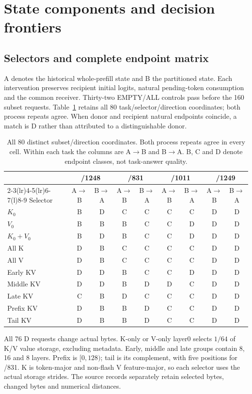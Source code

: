 \section{State components and decision frontiers}
\label{supp:composition}\label{supp:subsets}
\subsection{Selectors and complete endpoint matrix}
A denotes the historical whole-prefill state and B the partitioned state. Each intervention preserves recipient initial logits, natural pending-token consumption and the common receiver. Thirty-two EMPTY/ALL controls pass before the 160 subset requests. Table~\ref{tab:subsetmatrix} retains all 80 task/selector/direction coordinates; both process repeats agree. When donor and recipient natural endpoints coincide, a match is D rather than attributed to a distinguishable donor.
\begin{table}[t]
\centering\small
\caption{All 80 distinct subset/direction coordinates. Both process repeats agree in every cell. Within each task the columns are A$\to$B and B$\to$A. B, C and D denote endpoint classes, not task-answer quality.}
\label{tab:subsetmatrix}
\begin{tabular}{@{}l*{8}{c}@{}}\toprule
 & \multicolumn{2}{c}{/1248} & \multicolumn{2}{c}{/831} & \multicolumn{2}{c}{/1011} & \multicolumn{2}{c}{/1249}\\
\cmidrule(lr){2-3}\cmidrule(lr){4-5}\cmidrule(lr){6-7}\cmidrule(l){8-9}
Selector & A$\to$B & B$\to$A & A$\to$B & B$\to$A & A$\to$B & B$\to$A & A$\to$B & B$\to$A\\\midrule
$K_0$       & B&D&C&C&C&C&D&D\\
$V_0$       & B&B&B&C&C&D&D&D\\
$K_0+V_0$   & B&D&B&C&C&D&D&D\\
All K       & D&B&C&C&C&C&D&D\\
All V       & D&B&C&C&C&C&D&D\\
Early KV    & D&D&B&C&C&D&D&D\\
Middle KV   & D&D&B&D&D&C&D&D\\
Late KV     & C&B&D&C&C&C&D&D\\
Prefix KV   & D&B&B&D&C&C&D&D\\
Tail KV     & D&B&B&D&C&C&D&D\\\bottomrule
\end{tabular}
\end{table}
All 76 D requests change actual bytes. K-only or V-only layer0 selects $1/64$ of K/V value storage, excluding metadata. Early, middle and late groups contain 8, 16 and 8 layers. Prefix is $[0,128)$; tail is its complement, with five positions for /831. K is token-major and non-flash V feature-major, so each selector uses the actual storage strides. The source records separately retain selected bytes, changed bytes and numerical distances.

